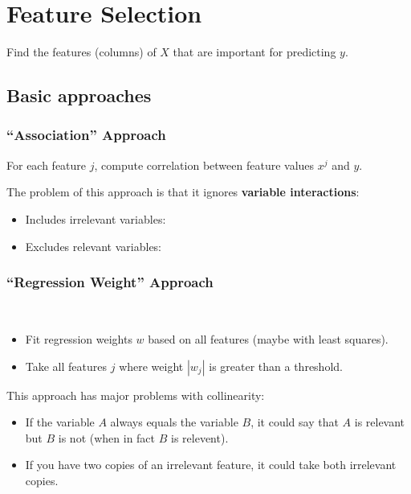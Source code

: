 \setcounter{chapter}{3}
\chapter{Feature Selection}

\begin{motivation}
    Find the features (columns) of $X$ that are important for predicting $y$.
\end{motivation}

\section{Basic approaches} \label{sec:}

\subsection{“Association” Approach} \label{sec:}

\begin{idea}
    For each feature $j$, compute correlation between feature values $x^{j}$ and $y$.
\end{idea}

\begin{problem}
    The problem of this approach is that it ignores \textbf{variable interactions}:
    \begin{itemize}
        \item Includes irrelevant variables:
        \item Excludes relevant variables:
    \end{itemize}
\end{problem}

\subsection{“Regression Weight” Approach} \label{sec:}
\begin{idea} ~
    \begin{itemize}
        \item Fit regression weights $w$ based on all features (maybe with least squares).
        \item Take all features $j$ where weight $|w_j|$ is greater than a threshold.
    \end{itemize}
\end{idea}

\begin{problem}
    This approach has major problems with collinearity:
    \begin{itemize}
        \item If the variable $A$ always equals the variable $B$, it could say that $A$ is relevant but $B$ is not (when in fact $B$ is relevent).
        \item If you have two copies of an irrelevant feature, it could take both irrelevant copies.
    \end{itemize}
\end{problem}

